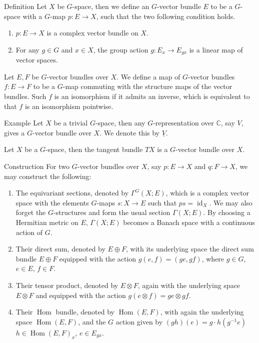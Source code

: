 \documentclass{beamer}
\DeclareMathOperator{\Hom}{\mathrm{Hom}}
\DeclareMathOperator{\id}{\mathrm{id}}
\begin{document}
\begin{frame}
	\begin{block}{Definition}
		Let $X$ be $G$-space, then we define an $G$-vector bundle $E$ to be a $G$-space with a $G$-map $p:E\to X$, such that the two following condition holds. 
		\begin{enumerate}
			\item $p:E\to X$ is a complex vector bundle on $X$. 
			\item For any $g\in G$ and $x\in X$, the group action $g:E_x\to E_{gx}$ is a linear map of vector spaces. 
		\end{enumerate}

		Let $E,F$ be $G$-vector bundles over $X$. We define a map of $G$-vector bundles $f:E\to F$ to be a $G$-map commuting with the structure maps of the vector bundles. Such $f$ is an isomorphism if it admits an inverse, which is equivalent to that $f$ is an isomorphism pointwise. 
	\end{block}
\end{frame}

\begin{frame}
	\begin{block}{Example}
		Let $X$ be a trivial $G$-space, then any $G$-representation over $\mathbb{C}$, say $V$, gives a $G$-vector bundle over $X$. We denote this by $\underline{V}$. 

		Let $X$ be a $G$-space, then the tangent bundle $TX$ is a $G$-vector bundle over $X$. 
	\end{block}	
\end{frame}

\begin{frame}
	\begin{block}{Construction}
		For two $G$-vector bundles over $X$, say $p:E\to X$ and $q:F\to X$, we may construct the following:
		\begin{enumerate}
			\item The equivariant sections, denoted by $\Gamma^G(X;E)$, which is a complex vector space with the elements $G$-maps $s:X\to E$ such that $ps=\id_X$. We may also forget the $G$-structures and form the usual section $\Gamma(X;E)$. By choosing a Hermitian metric on $E$, $\Gamma(X;E)$ becomes a Banach space with a continuous action of $G$. 
			\item Their direct sum, denoted by $E\oplus F$, with its underlying space the direct sum bundle $E\oplus F$ equipped with the action $g(e,f)=(ge,gf)$, where $g\in G$, $e\in E$, $f\in F$. 
			\item Their tensor product, denoted by $E\otimes F$, again with the underlying space $E\otimes F$ and equipped with the action $g(e\otimes f)=ge\otimes gf$. 
			\item Their $\Hom$ bundle, denoted by $\Hom(E,F)$, with again the underlying space $\Hom(E,F)$, and the $G$ action given by $(gh)(e)=g\cdot h(g^{-1}e)$ $h\in\Hom(E,F)_x$, $e\in E_{gx}$. 
		\end{enumerate}
	\end{block} 
\end{frame}
\end{document}

